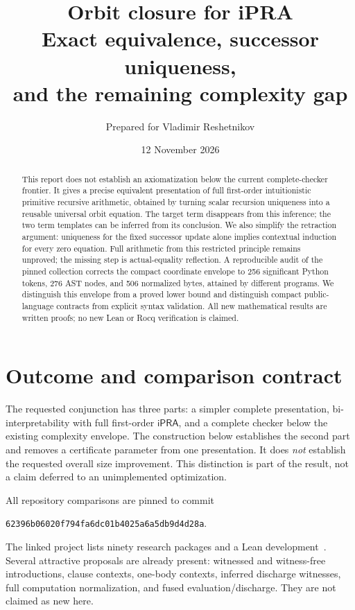 \documentclass[11pt]{article}
\title{\textbf{Orbit closure for iPRA}\\[0.4em]\large Exact equivalence, successor uniqueness,\\and the remaining complexity gap}
\author{Prepared for Vladimir Reshetnikov}
\date{12 November 2026}
\theoremstyle{definition}
\newcommand{\ipra}{\mathsf{iPRA}}
\begin{document}
\maketitle
\begin{abstract}
This report does not establish an axiomatization below the current complete-checker frontier. It gives a precise equivalent presentation of full first-order intuitionistic primitive recursive arithmetic, obtained by turning scalar recursion uniqueness into a reusable universal orbit equation. The target term disappears from this inference; the two term templates can be inferred from its conclusion. We also simplify the retraction argument: uniqueness for the fixed successor update alone implies contextual induction for every zero equation. Full arithmetic from this restricted principle remains unproved; the missing step is actual-equality reflection. A reproducible audit of the pinned collection corrects the compact coordinate envelope to 256 significant Python tokens, 276 AST nodes, and 506 normalized bytes, attained by different programs. We distinguish this envelope from a proved lower bound and distinguish compact public-language contracts from explicit syntax validation. All new mathematical results are written proofs; no new Lean or Rocq verification is claimed.
\end{abstract}
\tableofcontents
\newpage

\section{Outcome and comparison contract}

The requested conjunction has three parts: a simpler complete presentation, bi-interpretability with full first-order $\ipra$, and a complete checker below the existing complexity envelope. The construction below establishes the second part and removes a certificate parameter from one presentation. It does \emph{not} establish the requested overall size improvement. This distinction is part of the result, not a claim deferred to an unimplemented optimization.

All repository comparisons are pinned to commit
\begin{center}\texttt{62396b06020f794fa6dc01b4025a6a5db9d4d28a}.\end{center}
The linked project lists ninety research packages and a Lean development~\cite{repo}. Several attractive proposals are already present: witnessed and witness-free introductions, clause contexts, one-body contexts, inferred discharge witnesses, full computation normalization, and fused evaluation/discharge. They are not claimed as new here.
\end{document}
